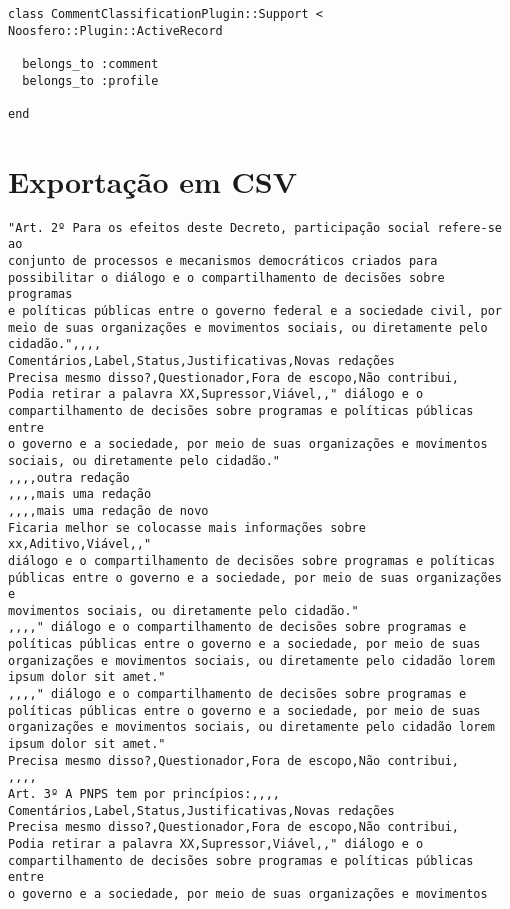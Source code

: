 \begin{lstlisting}[style=codeFrame]
class CommentClassificationPlugin::Support <
Noosfero::Plugin::ActiveRecord

  belongs_to :comment
  belongs_to :profile

end
\end{lstlisting}

\newpage
\section{Exportação em CSV} \label{App:PluginCSVFile}

\begin{verbatim}
"Art. 2º Para os efeitos deste Decreto, participação social refere-se ao
conjunto de processos e mecanismos democráticos criados para
possibilitar o diálogo e o compartilhamento de decisões sobre programas
e políticas públicas entre o governo federal e a sociedade civil, por
meio de suas organizações e movimentos sociais, ou diretamente pelo
cidadão.",,,,
Comentários,Label,Status,Justificativas,Novas redações
Precisa mesmo disso?,Questionador,Fora de escopo,Não contribui,
Podia retirar a palavra XX,Supressor,Viável,," diálogo e o
compartilhamento de decisões sobre programas e políticas públicas entre
o governo e a sociedade, por meio de suas organizações e movimentos
sociais, ou diretamente pelo cidadão."
,,,,outra redação
,,,,mais uma redação
,,,,mais uma redação de novo
Ficaria melhor se colocasse mais informações sobre xx,Aditivo,Viável,,"
diálogo e o compartilhamento de decisões sobre programas e políticas
públicas entre o governo e a sociedade, por meio de suas organizações e
movimentos sociais, ou diretamente pelo cidadão."
,,,," diálogo e o compartilhamento de decisões sobre programas e
políticas públicas entre o governo e a sociedade, por meio de suas
organizações e movimentos sociais, ou diretamente pelo cidadão lorem
ipsum dolor sit amet."
,,,," diálogo e o compartilhamento de decisões sobre programas e
políticas públicas entre o governo e a sociedade, por meio de suas
organizações e movimentos sociais, ou diretamente pelo cidadão lorem
ipsum dolor sit amet."
Precisa mesmo disso?,Questionador,Fora de escopo,Não contribui,
,,,,
Art. 3º A PNPS tem por princípios:,,,,
Comentários,Label,Status,Justificativas,Novas redações
Precisa mesmo disso?,Questionador,Fora de escopo,Não contribui,
Podia retirar a palavra XX,Supressor,Viável,," diálogo e o
compartilhamento de decisões sobre programas e políticas públicas entre
o governo e a sociedade, por meio de suas organizações e movimentos

\end{verbatim}
